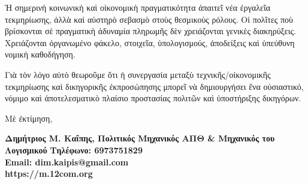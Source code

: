 \documentclass[12pt,a4paper]{article}
\begin{document}
Ἡ σημερινὴ κοινωνικὴ καὶ οἰκονομικὴ πραγματικότητα ἀπαιτεῖ νέα ἐργαλεῖα τεκμηρίωσης, ἀλλὰ καὶ αὐστηρὸ σεβασμὸ στοὺς θεσμικοὺς ρόλους. Οἱ πολῖτες ποὺ βρίσκονται σὲ πραγματικὴ ἀδυναμία πληρωμῆς δὲν χρειάζονται γενικὲς διακηρύξεις. Χρειάζονται ὀργανωμένο φάκελο, στοιχεῖα, ὑπολογισμούς, ἀποδείξεις καὶ ὑπεύθυνη νομικὴ καθοδήγηση. 

Γιὰ τὸν λόγο αὐτὸ θεωροῦμε ὅτι ἡ συνεργασία μεταξὺ τεχνικῆς/οἰκονομικῆς τεκμηρίωσης καὶ δικηγορικῆς ἐκπροσώπησης μπορεῖ νὰ δημιουργήσει ἕνα οὐσιαστικό, νόμιμο καὶ ἀποτελεσματικὸ πλαίσιο προστασίας πολιτῶν καὶ ὑποστήριξης δικηγόρων. 

Μὲ ἐκτίμηση, 

\vspace{2em} 

\begin{center}
	\begin{minipage}{15cm}
	\textbf{Δημήτριος Μ. Καΐπης, Πολιτικός Μηχανικός ΑΠΘ \& Μηχανικός του Λογισμικού}
\textbf{Τηλέφωνο: 6973751829}\\ 
\textbf{Email: dim.kaipis@gmail.com}\\ 
\textbf{https://m.12com.org} 
	\end{minipage}
\end{center}
\end{document}
